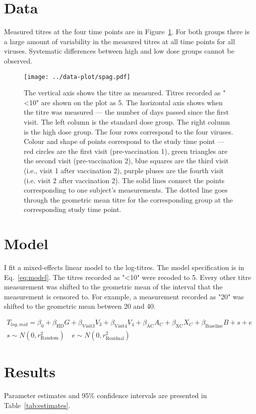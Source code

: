 \documentclass[11pt]{article}
\begin{document}
\section{Data}

Measured titres at the four time points are in Figure~\ref{fig:spag}.
For both groups there is a large amount of variability in the measured titres
at all time points for all viruses. Systematic differences between high and
low dose groups cannot be observed.

\begin{figure}[htp]
    \centering
    \texttt{[image: ../data-plot/spag.pdf]}
    \caption{
        The vertical axis shows the titre as measured.
        Titres recorded as "<10" are shown on the plot as 5.
        The horizontal axis shows when the titre was measured --- the number of
        days passed since the first visit.
        The left column is the standard dose group.
        The right column is the high dose group.
        The four rows correspond to the four viruses.
        Colour and shape of points correspond to the study time point ---
        red circles are the first visit (pre-vaccination 1),
        green triangles are the second visit (pre-vaccination 2),
        blue squares are the third visit (i.e., visit 1 after vaccination 2),
        purple pluses are the fourth visit (i.e. visit 2 after vaccination 2).
        The solid lines connect the points
        corresponding to one subject's measurements.
        The dotted line goes through the geometric mean titre for the
        corresponding group at the corresponding study time point.
    }
    \label{fig:spag}
\end{figure}

\section{Model}

I fit a mixed-effects linear model to the log-titres.
The model specification is in Eq.~\ref{eq:model}.
The titres recorded as "<10" were recoded to 5. Every other titre measurement
was shifted to the geometric mean of the interval that the measurement
is censored to. For example, a measurement recorded as "20" was shifted to the
geometric mean between 20 and 40.

\begin{gather}
    \label{eq:model}
    T_{log,mid} = \beta_0 + \beta_{\text{HD}}G + \beta_{\text{Visit3}}V_3
    + \beta_{\text{Visit4}}V_4 + \beta_{\text{AC}}A_C
    + \beta_{\text{XC}}X_C + \beta_{\text{Baseline}}B
    + s + e\\
    s \sim N(0, r^2_{\text{Random}}) \quad e \sim N(0, r^2_{\text{Residual}})
\end{gather}

\section{Results}

Parameter estimates and 95\% confidence intervals
are presented in Table~\ref{tab:estimates}.


\end{document}
